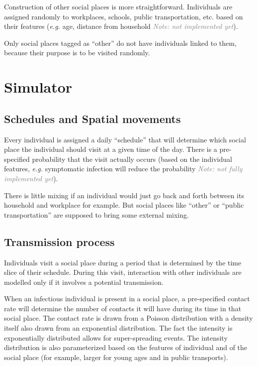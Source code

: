 \documentclass[11pt, onecolumn]{article}
\newcommand{\note}[1]{\textit{\textcolor{Grey}{Note: #1}}}
\newcommand{\eg}{\textit{e.g.}\xspace}
\begin{document}
Construction of other social places is more straightforward. Individuals are assigned randomly to workplaces, schools, public transportation, etc. based on their features (\eg age, distance from household \note{not implemented yet}). 

Only social places tagged as ``other'' do not have individuals linked to them, because their purpose is to be visited randomly. 



\section{Simulator}

\subsection{Schedules and Spatial movements}

Every individual is assigned a daily ``schedule'' that will determine which social place the individual should visit at a given time of the day. There is a pre-specified probability that the visit actually occurs (based on the individual features, \eg symptomatic infection will reduce the probability \note{not fully implemented yet}).

There is little mixing if an individual would just go back and forth between its household and workplace for example. But social places like ``other'' or ``public transportation'' are supposed to bring some external mixing.


\subsection{Transmission process}

Individuals visit a social place during a period that is determined by the time slice of their schedule. During this visit, interaction with other individuals are modelled only if it involves a potential transmission. 

When an infectious individual is present in a social place, a pre-specified contact rate will determine the number of contacts it will have during its time in that social place. The contact rate is drawn from a Poisson distribution with a density itself also drawn from an exponential distribution. The fact the intensity is exponentially distributed allows for super-spreading events. The intensity distribution is also parameterized based on the features of individual and of the social place (for example, larger for young ages and in public transports).
\end{document}
